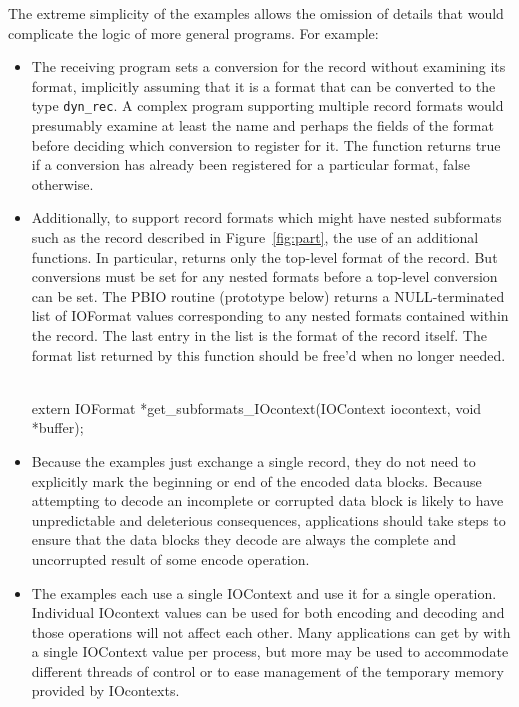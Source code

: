 The extreme simplicity of the examples allows the omission of details that
would complicate the logic of more general programs.  For example:
\begin{itemize}
\item The receiving program sets a conversion for the record without examining
its format, implicitly assuming that it is a format that can be converted to
the type {\tt dyn\_rec}.  A complex program supporting multiple record
formats would presumably examine at least the name and perhaps the fields of
the format before deciding which conversion to register for it.  The function
 returns true if a
conversion has already been registered for a particular format, false
otherwise. 
\item Additionally, to support record formats which might have nested
subformats such as the record described in Figure~\ref{fig:part}, the use of
an additional functions.  In particular, 
returns only the top-level format of the record.  But conversions must be set
for any nested formats before a top-level conversion can be set.  The PBIO
routine  (prototype below) returns a
NULL-terminated list of IOFormat values corresponding to any nested formats
contained within the record.  The last entry in the list is the format of the
record itself.  The format list returned by this function should be free'd
when no longer needed.
\ \begin{Code}
extern IOFormat *get_subformats_IOcontext(IOContext iocontext, void *buffer);
\end{Code}

\item Because the examples just exchange a single record, they do not need to
explicitly mark the beginning or end of the encoded data blocks.  Because
attempting to decode an incomplete or corrupted data block is likely to have
unpredictable and deleterious consequences, applications should take steps to
ensure that the data blocks they decode are always the complete and
uncorrupted result of some encode operation.
\item The examples each use a single IOContext and use it for a single
operation.  Individual IOcontext values can be used for both encoding and
decoding and those operations will not affect each other.  Many applications
can get by with a single IOContext value per process, but more may be used to
accommodate different threads of control or to ease management of the temporary
memory provided by IOcontexts.
\end{itemize}

